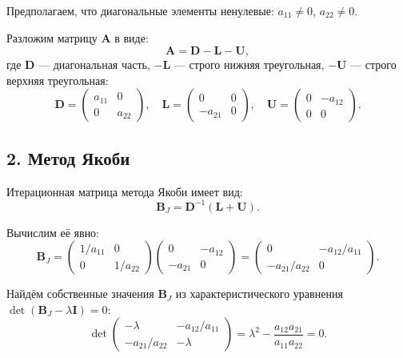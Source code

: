 \documentclass{article}
\begin{document}
Предполагаем, что диагональные элементы ненулевые: $a_{11} \neq 0$, $a_{22} \neq 0$.

Разложим матрицу $\mathbf{A}$ в виде:
\begin{equation}
\mathbf{A} = \mathbf{D} - \mathbf{L} - \mathbf{U},
\end{equation}
где $\mathbf{D}$ --- диагональная часть, $-\mathbf{L}$ --- строго нижняя треугольная, $-\mathbf{U}$ --- строго верхняя треугольная:
\begin{equation}
\mathbf{D} =
\begin{pmatrix}
a_{11} & 0 \\
0 & a_{22}
\end{pmatrix}, \quad
\mathbf{L} =
\begin{pmatrix}
0 & 0 \\
-a_{21} & 0
\end{pmatrix}, \quad
\mathbf{U} =
\begin{pmatrix}
0 & -a_{12} \\
0 & 0
\end{pmatrix}.
\end{equation}

\subsection*{2. Метод Якоби}

Итерационная матрица метода Якоби имеет вид:
\begin{equation}
\mathbf{B}_J = \mathbf{D}^{-1}(\mathbf{L} + \mathbf{U}).
\end{equation}

Вычислим её явно:
\begin{equation}
\mathbf{B}_J =
\begin{pmatrix}
1/a_{11} & 0 \\
0 & 1/a_{22}
\end{pmatrix}
\begin{pmatrix}
0 & -a_{12} \\
-a_{21} & 0
\end{pmatrix}
=
\begin{pmatrix}
0 & -a_{12}/a_{11} \\
-a_{21}/a_{22} & 0
\end{pmatrix}.
\end{equation}

Найдём собственные значения $\mathbf{B}_J$ из характеристического уравнения $\det(\mathbf{B}_J - \lambda \mathbf{I}) = 0$:
\begin{equation}
\det
\begin{pmatrix}
-\lambda & -a_{12}/a_{11} \\
-a_{21}/a_{22} & -\lambda
\end{pmatrix}
= \lambda^2 - \frac{a_{12} a_{21}}{a_{11} a_{22}} = 0.
\end{equation}
\end{document}

